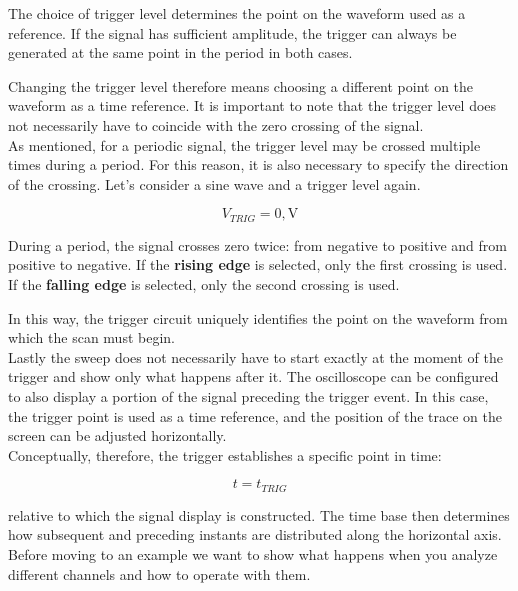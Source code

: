 \documentclass[../main.tex]{subfiles}
\begin{document}
The choice of trigger level determines the point on the waveform used as a reference. If the signal has sufficient amplitude, the trigger can always be generated at the same point in the period in both cases.

Changing the trigger level therefore means choosing a different point on the waveform as a time reference. It is important to note that the trigger level does not necessarily have to coincide with the zero crossing of the signal.\\

As mentioned, for a periodic signal, the trigger level may be crossed multiple times during a period. For this reason, it is also necessary to specify the direction of the crossing. Let’s consider a sine wave and a trigger level again. 

\begin{equation}
	V_{TRIG}=0,\text{V}
\end{equation}

During a period, the signal crosses zero twice: from negative to positive and from positive to negative. If the \textbf{rising edge }is selected, only the first crossing is used. If the \textbf{falling edge} is selected, only the second crossing is used.

In this way, the trigger circuit uniquely identifies the point on the waveform from which the scan must begin.\\

Lastly the sweep does not necessarily have to start exactly at the moment of the trigger and show only what happens after it. The oscilloscope can be configured to also display a portion of the signal preceding the trigger event. In this case, the trigger point is used as a time reference, and the position of the trace on the screen can be adjusted horizontally.\\

Conceptually, therefore, the trigger establishes a specific point in time:

\begin{equation}
	t=t_{TRIG}
\end{equation}

relative to which the signal display is constructed. The time base then determines how subsequent and preceding instants are distributed along the horizontal axis.\\

Before moving to an example we want to show what happens when you analyze different channels and how to operate with them.
\end{document}
